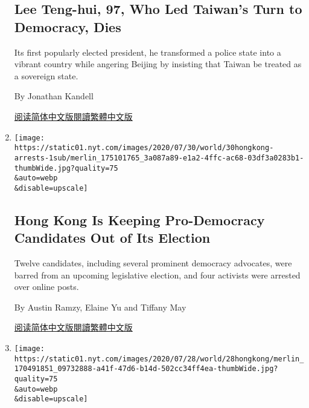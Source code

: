 \begin{enumerate}
{  \subsection{Lee Teng-hui, 97, Who Led Taiwan's Turn to Democracy,
  Dies}\label{lee-teng-hui-97-who-led-taiwans-turn-to-democracy-dies}}

  Its first popularly elected president, he transformed a police state
  into a vibrant country while angering Beijing by insisting that Taiwan
  be treated as a sovereign state.

  By Jonathan Kandell

  \href{https://cn.nytimes.com/asia-pacific/20200730/lee-teng-hui-dead/}{阅读简体中文版}\href{https://cn.nytimes.com/asia-pacific/20200730/lee-teng-hui-dead/zh-hant/}{閱讀繁體中文版}
\item
  \href{/2020/07/29/world/asia/hong-kong-arrests-security-law.html}{}

  \texttt{[image: https://static01.nyt.com/images/2020/07/30/world/30hongkong-arrests-1sub/merlin\_175101765\_3a087a89-e1a2-4ffc-ac68-03df3a0283b1-thumbWide.jpg?quality=75\\\&auto=webp\\\&disable=upscale]}

  \hypertarget{hong-kong-is-keeping-pro-democracy-candidates-out-of-its-election}{%
  \subsection{Hong Kong Is Keeping Pro-Democracy Candidates Out of Its
  Election}\label{hong-kong-is-keeping-pro-democracy-candidates-out-of-its-election}}

  Twelve candidates, including several prominent democracy advocates,
  were barred from an upcoming legislative election, and four activists
  were arrested over online posts.

  By Austin Ramzy, Elaine Yu and Tiffany May

  \href{https://cn.nytimes.com/china/20200730/hong-kong-arrests-security-law/}{阅读简体中文版}\href{https://cn.nytimes.com/china/20200730/hong-kong-arrests-security-law/zh-hant/}{閱讀繁體中文版}
\item
  \href{/2020/07/28/world/asia/benny-tai-hong-kong-university.html}{}

  \texttt{[image: https://static01.nyt.com/images/2020/07/28/world/28hongkong/merlin\_170491851\_09732888-a41f-47d6-b14d-502cc34ff4ea-thumbWide.jpg?quality=75\\\&auto=webp\\\&disable=upscale]}

  \hypertarget{hong-kong-university-to-fire-law-professor-who-inspired-protests}{%
}
\end{enumerate}
